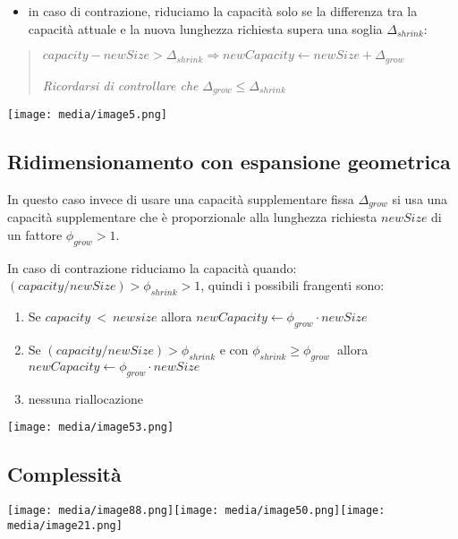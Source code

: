 \begin{itemize}
\item
  in caso di contrazione, riduciamo la capacità solo se la differenza
  tra la capacità attuale e la nuova lunghezza richiesta supera una
  soglia \(\Delta_{shrink}\):
\end{itemize}

\begin{quote}
\(capacity - newSize > \Delta_{shrink} \Rightarrow newCapacity \leftarrow newSize + \Delta_{grow}\)

\emph{Ricordarsi di controllare che}
\(\Delta_{grow} \leq\)\(\Delta_{shrink}\)
\end{quote}

\texttt{[image: media/image5.png]}

\subsection{Ridimensionamento con espansione
geometrica}\label{ridimensionamento-con-espansione-geometrica}

In questo caso invece di usare una capacità supplementare fissa
\(\Delta_{grow}\) si usa una capacità supplementare che è proporzionale
alla lunghezza richiesta \(newSize\) di un fattore \(\phi_{grow} > 1\).

In caso di contrazione riduciamo la capacità quando:
\((capacity/newSize) > \phi_{shrink} > 1\), quindi i possibili frangenti
sono:

\begin{enumerate}
\def\labelenumi{\arabic{enumi}.}
\item
  Se \(capacity\  < \ newsize\) allora
  \(newCapacity \leftarrow \phi_{grow} \cdot newSize\)
\item
  Se \((capacity/newSize) > \phi_{shrink}\) e con
  \(\phi_{shrink} \geq \phi_{grow}\ \) allora
  \(newCapacity \leftarrow \phi_{grow} \cdot newSize\)
\item
  nessuna riallocazione
\end{enumerate}

\texttt{[image: media/image53.png]}

\subsection{Complessità}\label{complessituxe0}

\texttt{[image: media/image88.png]}\texttt{[image: media/image50.png]}\texttt{[image: media/image21.png]}

